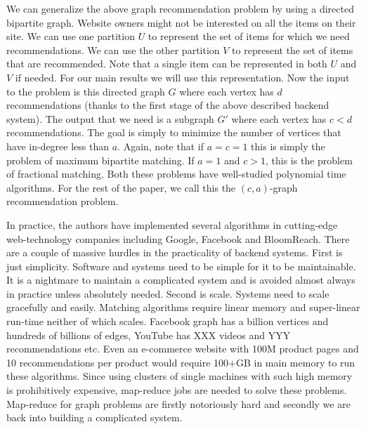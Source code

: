 








We can generalize the above graph recommendation problem by using a directed bipartite graph.
Website owners might not be interested on all the items on their site. We can use one partition $U$
to represent the set of items for which we need recommendations. We can use the other partition $V$
to represent the set of items that are recommended. Note that a single item can be represented in
both $U$ and $V$ if needed. For our main results we will use this representation. Now the input
to the problem is this directed graph $G$ where each vertex has $d$ recommendations (thanks to the
first stage of the above described backend system). The output that we need is a subgraph $G'$
where each vertex has $c < d$ recommendations. The goal is simply to minimize the number of vertices
that have in-degree less than $a$. Again, note that if $a=c=1$ this is simply the problem of
maximum bipartite matching\cite{}. If $a=1$ and $c > 1$, this is the problem of fractional
matching\cite{}. Both these problems have well-studied polynomial time algorithms\cite{}. For the
rest of the paper, we call this the $(c, a)$-graph recommendation problem. \vs

In practice, the authors have implemented several algorithms in cutting-edge web-technology companies
including Google, Facebook and BloomReach. There are a couple of massive hurdles in the practicality
of backend systems. First is just simplicity. Software and systems need to be simple for it to be
maintainable. It is a nightmare to maintain a complicated system and is avoided almost always
in practice unless absolutely needed. Second is scale. Systems need to scale gracefully and easily. Matching
algorithms require linear memory and super-linear run-time neither of which scales. Facebook graph has
a billion vertices\cite{} and hundreds of billions of edges\cite{},
YouTube has XXX videos and YYY recommendations\cite{} etc. Even an e-commerce website with 100M product
pages and 10 recommendations per product would require 100+GB in main memory to run these algorithms. Since
using clusters of single machines with such high memory is prohibitively expensive, map-reduce\cite{} jobs
are needed to solve these problems. Map-reduce for graph problems are firstly notoriously hard and secondly
we are back into building a complicated system. \vs

